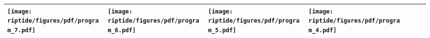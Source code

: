 {\begin{table*}[t]
{\begin{tabular}{p{0.35in}P{1.25in}P{1.25in}P{1.25in}P{1.25in}P{1.25in}P{1.35in}}
			\texttt{[image: riptide/figures/pdf/program\_7.pdf]} &
			\texttt{[image: riptide/figures/pdf/program\_6.pdf]} &
			\texttt{[image: riptide/figures/pdf/program\_5.pdf]} &
			\texttt{[image: riptide/figures/pdf/program\_4.pdf]} \\
			\bottomrule
		\end{tabular}
	}
\end{table*}
}

\newcommand{\figRipTideLSOResults}{
\begin{figure}[htb]
	\centering
	\texttt{[image: riptide/figures/pdf/lso-graph-crop.pdf]}
	\caption{}
	\label{fig:riptide:eval:fin}
\end{figure}
}

